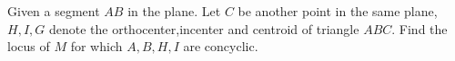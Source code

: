 Given a segment $AB$ in the plane. Let $C$ be another point in the same plane,$H,I,G$ denote the orthocenter,incenter and centroid of triangle $ABC$. Find the locus of $M$ for which $A,B,H,I$ are concyclic.